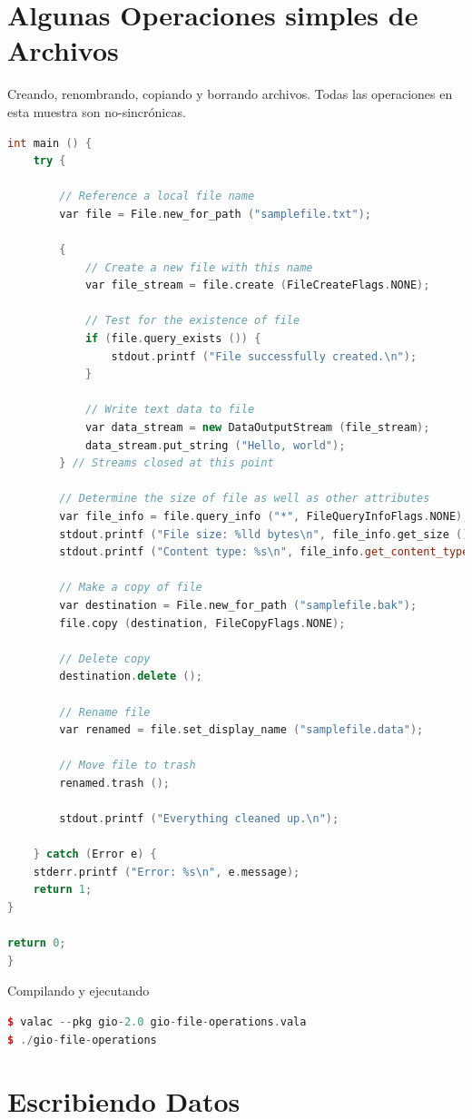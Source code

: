 \documentclass[12pt,twoside]{book}
\begin{document}
\section{Algunas Operaciones simples de Archivos}

Creando, renombrando, copiando y borrando archivos. Todas las operaciones en esta muestra son no-sincrónicas.

\begin{lstlisting}[language=C++]
int main () {
	try {
		
		// Reference a local file name
		var file = File.new_for_path ("samplefile.txt");
		
		{
			// Create a new file with this name
			var file_stream = file.create (FileCreateFlags.NONE);
			
			// Test for the existence of file
			if (file.query_exists ()) {
				stdout.printf ("File successfully created.\n");
			}
			
			// Write text data to file
			var data_stream = new DataOutputStream (file_stream);
			data_stream.put_string ("Hello, world");
		} // Streams closed at this point
		
		// Determine the size of file as well as other attributes
		var file_info = file.query_info ("*", FileQueryInfoFlags.NONE);
		stdout.printf ("File size: %lld bytes\n", file_info.get_size ());
		stdout.printf ("Content type: %s\n", file_info.get_content_type ());
		
		// Make a copy of file
		var destination = File.new_for_path ("samplefile.bak");
		file.copy (destination, FileCopyFlags.NONE);
		
		// Delete copy
		destination.delete ();
		
		// Rename file
		var renamed = file.set_display_name ("samplefile.data");
		
		// Move file to trash
		renamed.trash ();
		
		stdout.printf ("Everything cleaned up.\n");
		
	} catch (Error e) {
	stderr.printf ("Error: %s\n", e.message);
	return 1;
}

return 0;
}
\end{lstlisting}
 
Compilando y ejecutando

\begin{lstlisting}[language=C++]
$ valac --pkg gio-2.0 gio-file-operations.vala
$ ./gio-file-operations
\end{lstlisting}

\section{Escribiendo Datos}
\end{document}

